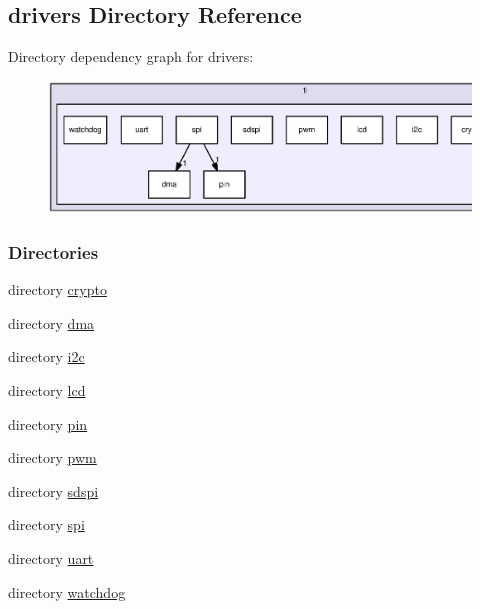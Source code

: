 \subsection{drivers Directory Reference}
\label{dir_2054deab5a2f23ad8f1b385d1b72a49e}
Directory dependency graph for drivers\-:
\nopagebreak
\begin{figure}[H]
\begin{center}
\leavevmode
\includegraphics[width=350pt]{dir_2054deab5a2f23ad8f1b385d1b72a49e_dep}
\end{center}
\end{figure}
\subsubsection*{Directories}
\begin{DoxyCompactItemize}
\item 
directory \hyperlink{dir_49e040e15de4c143cf71a2ac21bced85}{crypto}
\item 
directory \hyperlink{dir_86d53b1fe72f4e39c818d6d79a0d8b7f}{dma}
\item 
directory \hyperlink{dir_4c0bb77e0e84c77a30bc5ffd8eeb46d3}{i2c}
\item 
directory \hyperlink{dir_3549aaa9e7c92504e133d69437e057d5}{lcd}
\item 
directory \hyperlink{dir_32a9d2124f81b6ef56827d5e26859891}{pin}
\item 
directory \hyperlink{dir_76361b7eb9227ce140ba2f526acb4722}{pwm}
\item 
directory \hyperlink{dir_30657ae490b6a24146652e74fc90dffa}{sdspi}
\item 
directory \hyperlink{dir_f6361f2db12d9411a4cc3a9f4eb7f57b}{spi}
\item 
directory \hyperlink{dir_390a80247cd546be4466ff12651c09f4}{uart}
\item 
directory \hyperlink{dir_9bca4ecaf396a946ef2bb2a54a92fdaa}{watchdog}
\end{DoxyCompactItemize}
